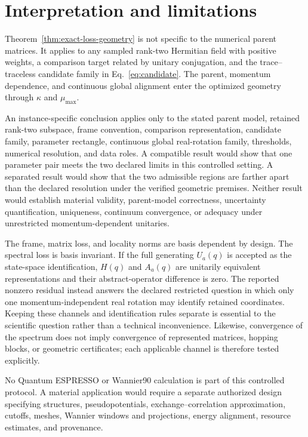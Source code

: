 \documentclass[11pt]{article}
\begin{document}
\section{Interpretation and limitations}

Theorem~\ref{thm:exact-loss-geometry} is not specific to the numerical parent matrices.
It applies to any sampled rank-two Hermitian field with positive weights, a comparison
target related by unitary conjugation, and the trace--traceless candidate family in
Eq.~\eqref{eq:candidate}. The parent, momentum dependence, and continuous global
alignment enter the optimized geometry through $\kappa$ and $\mu_{\max}$.

An instance-specific conclusion applies only to the stated parent model, retained
rank-two subspace, frame convention, comparison representation, candidate family,
parameter rectangle, continuous global real-rotation family, thresholds, numerical
resolution, and data roles.
A compatible result would show that one parameter pair meets the two declared limits in
this controlled setting. A separated result would show that the two admissible regions
are farther apart than the declared resolution under the verified geometric premises.
Neither result would establish material validity, parent-model correctness, uncertainty
quantification, uniqueness, continuum convergence, or adequacy under unrestricted
momentum-dependent unitaries.

The frame, matrix loss, and locality norms are basis dependent by design. The spectral
loss is basis invariant. If the full generating $U_a(q)$ is accepted as the state-space
identification, $H(q)$ and $A_a(q)$ are unitarily equivalent representations and their
abstract-operator difference is zero. The reported nonzero residual instead answers the
declared restricted question in which only one momentum-independent real rotation may
identify retained coordinates. Keeping these channels and identification rules separate
is essential to the scientific question rather than a technical inconvenience.
Likewise, convergence of the spectrum does not imply convergence of represented
matrices, hopping blocks, or geometric certificates; each applicable channel is
therefore tested explicitly.

No Quantum ESPRESSO or Wannier90 calculation is part of this controlled protocol. A
material application would require a separate authorized design specifying structures,
pseudopotentials, exchange--correlation approximation, cutoffs, meshes, Wannier
windows and projections, energy alignment, resource estimates, and provenance.
\end{document}
